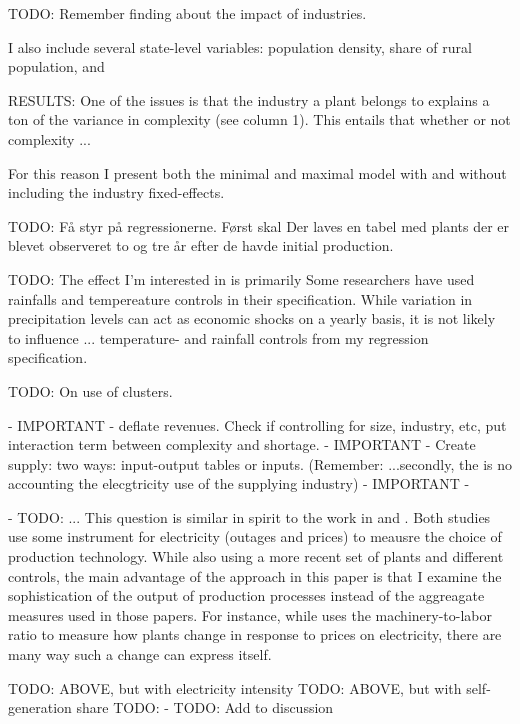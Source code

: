 \documentclass[11pt]{article}
\begin{document}
TODO: Remember finding about the impact of industries.

I also include several state-level variables: population density, share of rural population, and 


RESULTS: One of the issues is that the industry a plant belongs to explains a ton of the variance in complexity (see column 1). This entails that whether or not complexity ...

For this reason I present both the minimal and maximal model with and without including the industry fixed-effects.

TODO: Få styr på regressionerne. Først skal Der laves en tabel med plants der er blevet observeret to og tre år efter de havde initial production.

TODO: The effect I'm interested in is primarily 
Some researchers have used rainfalls and tempereature controls in their specification. While variation in precipitation levels can act as economic shocks on a yearly basis, it is not likely to influence ... 
temperature- and rainfall controls from my regression specification.


TODO: On use of clusters. 

 - IMPORTANT - deflate revenues. Check if controlling for size, industry, etc, put interaction term between complexity and shortage.
 - IMPORTANT - Create supply: two ways: input-output tables or inputs. (Remember: ...secondly, the is no accounting the elecgtricity use of the supplying industry)
 - IMPORTANT - 

- TODO: ... This question is similar in spirit to the work in \cite{allcott_how_2016} and \cite{abeberese_electricity_2017}. Both studies use some instrument for electricity (outages and prices) to meausre the choice of production technology. While also using a more recent set of plants and different controls, the main advantage of the approach in this paper is that I examine the sophistication of the output of production processes instead of the aggreagate measures used in those papers. For instance, while \cite{abeberese_electricity_2017} uses the machinery-to-labor ratio to measure how plants change in response to prices on electricity, there are many way such a change can express itself. 





TODO: ABOVE, but with electricity intensity
TODO: ABOVE, but with self-generation share
TODO: 
 - TODO: Add to discussion
\end{document}
